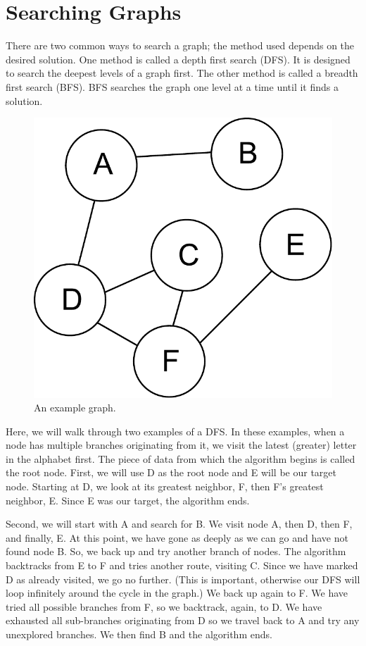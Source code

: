 \label{lab:SixDegreesKevinBacon}



\section*{Searching Graphs}
There are two common ways to search a graph;
the method used depends on the desired solution.
One method is called a depth first search (DFS).  It is designed to search the deepest levels of a graph first.
The other method is called a breadth first search (BFS).  BFS searches the graph one level at a time until it finds a solution.
\begin{figure}[h]
\centering
\includegraphics[width=.5\textwidth]{graph.pdf}
\caption{An example graph.}
\label{fig:bfs_dfs_graph}
\end{figure}


Here, we will walk through two examples of a DFS.
In these examples, when a node has multiple branches originating from it, we visit the latest (greater) letter in the alphabet first. The piece of data from which the algorithm begins is called the root node.
First, we will use D as the root node and E will be our target node.
Starting at D, we look at its greatest neighbor, F, then F's greatest neighbor, E.
Since E was our target, the algorithm ends.

Second, we will start with A and search for B.
We visit node A, then D, then F, and finally, E.
At this point, we have gone as deeply as we can go and have not found node B.
So, we back up and try another branch of nodes.
The algorithm backtracks from E to F and tries another route, visiting C.
Since we have marked D as already visited, we go no further.
(This is important, otherwise our DFS will loop infinitely around the cycle in the graph.)
We back up again to F.  We have tried all possible branches from F, so we backtrack, again, to D.
We have exhausted all sub-branches originating from D so we travel back to A and try any unexplored branches.
We then find B and the algorithm ends.


